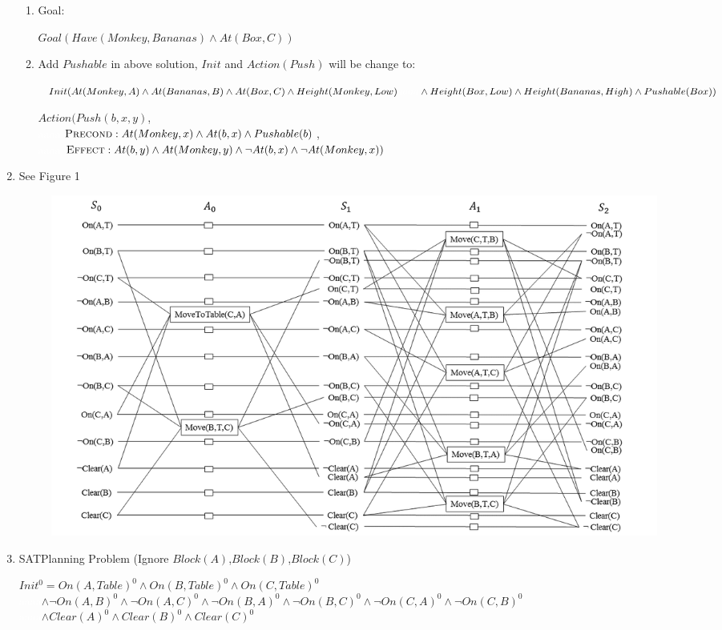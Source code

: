\documentclass{article}
\begin{document}
\begin{enumerate}
\begin{enumerate}
	\item Goal:

		$Goal(Have(Monkey,Bananas) \land At(Box,C))$
	
	\item Add $Pushable$ in above solution, $Init$ and $Action(Push)$ will be change to:

		$Init(At(Monkey,A) \land At(Bananas,B) \land At(Box,C) \land Height(Monkey,Low) \\
		\textcolor{white}{aaaa} \land Height(Box,Low) \land Height(Bananas,High) \land Pushable(Box))$

		$Action(Push(b, x, y)$, \\
		\textcolor{white}{aaaa}$\textsc{Precond}:At(Monkey, x) \land At(b,x) \land Pushable(b)$, \\
		\textcolor{white}{aaaa}$\textsc{Effect}:At(b, y) \land At(Monkey, y) \land \neg At(b, x) \land \neg At(Monkey, x))$ 

\end{enumerate}

\item See Figure 1

    \begin{figure}
    \includegraphics[width=\textwidth]{figure/Slide1.PNG}
    \caption{}
    \end{figure}

\item SATPlanning Problem (Ignore $Block(A)$,$Block(B)$,$Block(C)$)

$Init^0 = On(A,Table)^0 \land On(B,Table)^0 \land On(C,Table)^0$ \\
\textcolor{white}{aaaa}$\land \neg On(A,B)^0 \land \neg On(A,C)^0 \land \neg On(B,A)^0 \land \neg On(B,C)^0 \land \neg On(C,A)^0 \land \neg On(C,B)^0$ \\
\textcolor{white}{aaaa}$\land Clear(A)^0 \land Clear(B)^0 \land Clear(C)^0$


\end{enumerate}
\end{document}
